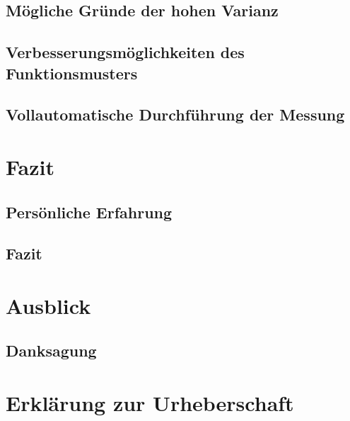 \documentclass[a4paper,12pt]{article}
\begin{document}
\subsection{Mögliche Gründe der hohen Varianz}

%

\subsection{Verbesserungsmöglichkeiten des Funktionsmusters}

\newpage
\subsection{Vollautomatische Durchführung der Messung}


\newpage
\section{Fazit}
%

\subsection{Persönliche Erfahrung}


\subsection{Fazit}


\section{Ausblick}

\newpage
\subsection*{Danksagung}


\newpage
%


\newpage
\section*{Erklärung zur Urheberschaft}

\end{document}
